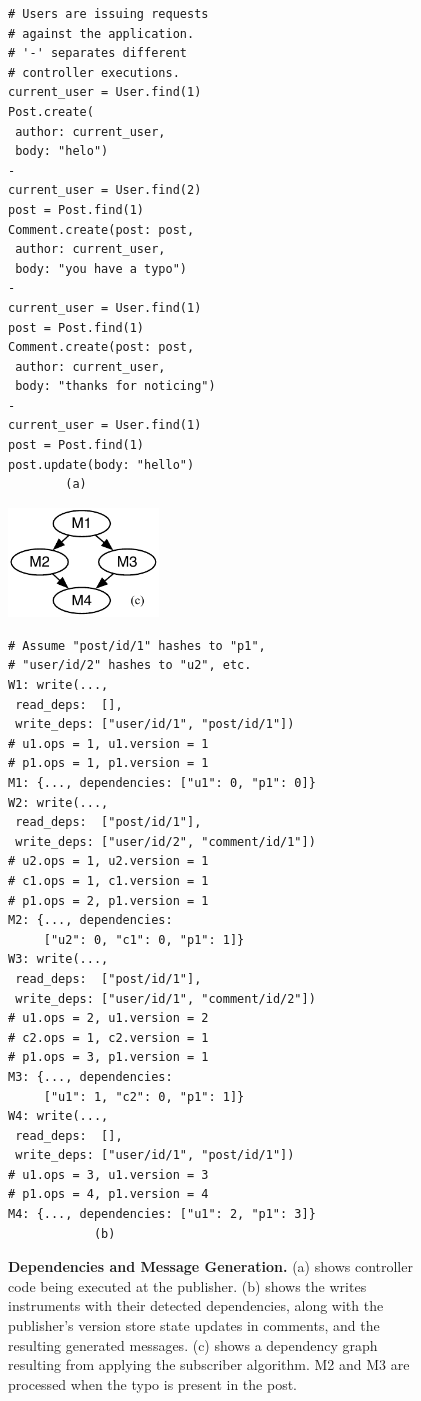 \begin{figure}
\centering
\begin{minipage}{.32\textwidth}
  \footnotesize
\begin{lstlisting}[framexleftmargin=5pt]
# Users are issuing requests
# against the application.
# '-' separates different
# controller executions.
current_user = User.find(1)
Post.create(
 author: current_user,
 body: "helo")
-
current_user = User.find(2)
post = Post.find(1)
Comment.create(post: post,
 author: current_user,
 body: "you have a typo")
-
current_user = User.find(1)
post = Post.find(1)
Comment.create(post: post,
 author: current_user,
 body: "thanks for noticing")
-
current_user = User.find(1)
post = Post.find(1)
post.update(body: "hello")
        (a)
\end{lstlisting}
\hspace{1em}
\vspace{1.7em}
\includegraphics[width=4cm]{figures/synapse/dep-graph.pdf}
\end{minipage}
\hspace{3em}
\begin{minipage}{0.45\textwidth}
  \footnotesize
\begin{lstlisting}[framexleftmargin=5pt]
# Assume "post/id/1" hashes to "p1",
# "user/id/2" hashes to "u2", etc.
W1: write(...,
 read_deps:  [],
 write_deps: ["user/id/1", "post/id/1"])
# u1.ops = 1, u1.version = 1
# p1.ops = 1, p1.version = 1
M1: {..., dependencies: ["u1": 0, "p1": 0]}
W2: write(...,
 read_deps:  ["post/id/1"],
 write_deps: ["user/id/2", "comment/id/1"])
# u2.ops = 1, u2.version = 1
# c1.ops = 1, c1.version = 1
# p1.ops = 2, p1.version = 1
M2: {..., dependencies:
     ["u2": 0, "c1": 0, "p1": 1]}
W3: write(...,
 read_deps:  ["post/id/1"],
 write_deps: ["user/id/1", "comment/id/2"])
# u1.ops = 2, u1.version = 2
# c2.ops = 1, c2.version = 1
# p1.ops = 3, p1.version = 1
M3: {..., dependencies:
     ["u1": 1, "c2": 0, "p1": 1]}
W4: write(...,
 read_deps:  [],
 write_deps: ["user/id/1", "post/id/1"])
# u1.ops = 3, u1.version = 3
# p1.ops = 4, p1.version = 4
M4: {..., dependencies: ["u1": 2, "p1": 3]}
            (b)
\end{lstlisting}
\end{minipage}

\caption{{\bf Dependencies and Message Generation.}
(a) shows controller code being executed at the publisher.
(b) shows the writes \synapse instruments with their detected
  dependencies, along with the publisher's version store state updates
  in comments, and the resulting generated messages.
(c) shows a dependency graph resulting from applying the subscriber algorithm.
M2 and M3 are processed when the typo is present in the post.
}
\label{synapse:fig:deps-example}
\end{figure}

